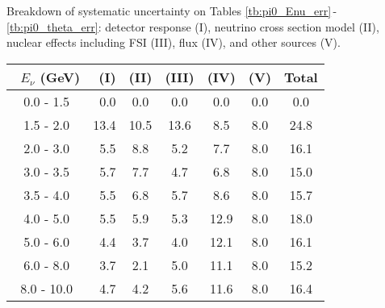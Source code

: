 \documentclass[aps, prd, reprint,showpacs,  preprintnumbers,amsmath,amssymb,superscriptaddress, nofootinbib]{revtex4-1}
\makeatletter
\renewenvironment{table}
  {\def\@captype{table}}
  {}
\makeatother
\begin{document}
Breakdown of systematic uncertainty on Tables \ref{tb:pi0_Enu_err}\,-\,\ref{tb:pi0_theta_err}: detector response (I), 
neutrino cross section model (II), nuclear effects including FSI (III), flux (IV), 
and other sources (V).  %

\begin{table}
\centering
\begin{tabular}{crccccc}
\hline
~$E_{\nu}$ (GeV) & (I) & (II) & (III) & (IV) & (V) & Total \\
\hline
 0.0 -  1.5  & 0.0   & 0.0   & 0.0   & 0.0   & 0.0   & 0.0  \\
 1.5 -  2.0  &13.4   &10.5   &13.6   & 8.5   & 8.0   &24.8  \\
 2.0 -  3.0  & 5.5   & 8.8   & 5.2   & 7.7   & 8.0   &16.1  \\
 3.0 -  3.5  & 5.7   & 7.7   & 4.7   & 6.8   & 8.0   &15.0  \\
 3.5 -  4.0  & 5.5   & 6.8   & 5.7   & 8.6   & 8.0   &15.7  \\
 4.0 -  5.0  & 5.5   & 5.9   & 5.3   &12.9   & 8.0   &18.0  \\
 5.0 -  6.0  & 4.4   & 3.7   & 4.0   &12.1   & 8.0   &16.1  \\
 6.0 -  8.0  & 3.7   & 2.1   & 5.0   &11.1   & 8.0   &15.2  \\
 8.0 - 10.0  & 4.7   & 4.2   & 5.6   &11.6   & 8.0   &16.4  \\
\hline
\hline
\end{tabular}
\caption{Fractional systematic uncertainties (in percent) on $\sigma(E_\nu)$.}
\label{tb:pi0_Enu_err}
\end{table}

\vspace{1cm}

\end{document}

